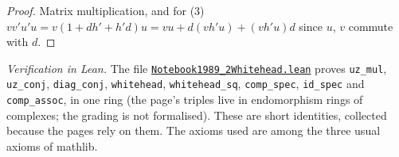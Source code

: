 \begin{proof}
Matrix multiplication, and for (3) $vv'u'u = v(1 + dh' + h'd)u = vu + d(vh'u) + (vh'u)d$ since $u$, $v$ commute with $d$.
\end{proof}

\emph{Verification in Lean.} The file \href{\leanblobmain/Notebook1989_2Whitehead.lean}{\texttt{Notebook1989\_2Whitehead.\allowbreak{}lean}} proves \texttt{uz\_mul}, \texttt{uz\_conj}, \texttt{diag\_conj}, \texttt{whitehead}, \texttt{whitehead\_sq}, \texttt{comp\_spec}, \texttt{id\_spec} and \texttt{comp\_assoc}, in one ring (the page's triples live in endomorphism rings of complexes; the grading is not formalised). These are short identities, collected because the pages rely on them. The axioms used are among the three usual axioms of mathlib.

